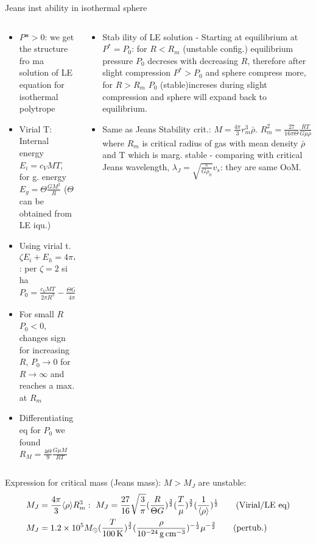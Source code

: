 \begin{frame}{Jeans inst ability in isothermal sphere}
    \begin{columns}[T]
        \begin{column}{0.5\textwidth}
            \begin{itemize}
                \item $P*>0$: we get the structure fro ma solution of LE equation for isothermal polytrope
                \item Virial T: Internal energy $E_i=c_VMT$, for g. energy $E_g=\Theta \frac{GM^2}{R}$ ($\Theta$ can be obtained from LE iqu.)
                \item Using  virial t. $\zeta E_i+E_h=4\pi R^3P_0$: per $\zeta=2$ si ha $P_0=\frac{c_VMT}{2\pi R^3}-\frac{\Theta GM^2}{4\pi R^4}$
                \item For small $R$ $P_0<0$, changes sign for increasing $R$, $P_0\to0$ for $R\to\infty$ and reaches a max. at $R_m$
                \item Differentiating eq for $P_0$ we found $R_M=\frac{4\Theta}{9}\frac{G\mu M}{RT}$
            \end{itemize}
        \end{column}
        \begin{column}{0.5\textwidth}
            \begin{itemize}
                \item Stab ility of LE solution - Starting at equilibrium at $P^*=P_0$: for $R<R_m$ (unstable config.) equilibrium pressure $P_0$ decreses with decreasing $R$, therefore after slight compression $P^*>P_0$ and sphere compress more, for $R>R_m$ $P_0$ (stable)increses during slight compression and sphere will expand back to equilibrium.
                \item Same as Jeans Stability crit.: $M=\frac{4\pi}{3}r_m^3\bar{\rho}$. $R_m^2=\frac{27}{16\pi\Theta}\frac{RT}{G\mu\bar{\rho}}$ where $R_m$ is critical radius of gas with mean density $\bar{\rho}$ and T which is marg. stable - comparing with critical Jeans wavelength, $\lambda_J=\sqrt{\frac{\pi} {G\rho_0}}v_s$: they are same OoM.
            \end{itemize}
        \end{column}
    \end{columns}
    Expression for critical mass (Jeans mass): $M>M_J$ are unstable:
	\begin{align*} 
        &M_J=\frac{4\pi}{3}\exv{\rho}R_m^3:\ M_J=\frac{27}{16}\sqrt{\frac{3}{\pi}}(\frac{R}{\Theta G})^{\frac{3}{2}}(\frac{T}{\mu})^{\frac{3}{2}}(\frac{1}{\exv{\rho}})^{\frac{1}{2}}\tag{Virial/LE eq}\\
&M_J=\num{1.2e5}\msun{}(\frac{T}{\SI{100}{\kelvin}})^{\frac{3}{2}}(\frac{\rho}{\SI{e-24}{\gram\per\cubic\cm}})^{-\frac{1}{2}}\mu^{-\frac{3}{2}}\tag{pertub.}
	\end{align*}
\end{frame}


